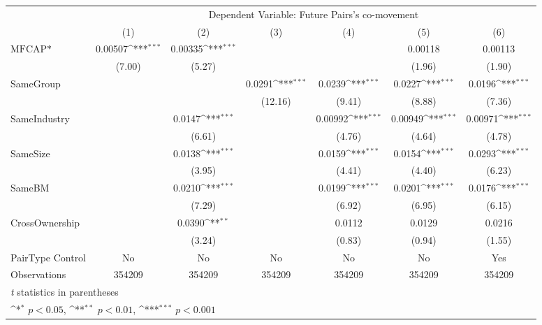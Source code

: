 {
\def\sym#1{\ifmmode^{#1}\else\(^{#1}\)\fi}
\begin{tabular}{l*{6}{c}}
\hline\hline
                &\multicolumn{6}{c}{Dependent Variable:  Future Pairs's co-movement}                                              \\\cmidrule(lr){2-7}
                &\multicolumn{1}{c}{(1)}         &\multicolumn{1}{c}{(2)}         &\multicolumn{1}{c}{(3)}         &\multicolumn{1}{c}{(4)}         &\multicolumn{1}{c}{(5)}         &\multicolumn{1}{c}{(6)}         \\
\hline
$ \text{MFCAP*} $&  0.00507\sym{***}&  0.00335\sym{***}&                  &                  &  0.00118         &  0.00113         \\
                &   (7.00)         &   (5.27)         &                  &                  &   (1.96)         &   (1.90)         \\
[1em]
SameGroup       &                  &                  &   0.0291\sym{***}&   0.0239\sym{***}&   0.0227\sym{***}&   0.0196\sym{***}\\
                &                  &                  &  (12.16)         &   (9.41)         &   (8.88)         &   (7.36)         \\
[1em]
SameIndustry    &                  &   0.0147\sym{***}&                  &  0.00992\sym{***}&  0.00949\sym{***}&  0.00971\sym{***}\\
                &                  &   (6.61)         &                  &   (4.76)         &   (4.64)         &   (4.78)         \\
[1em]
SameSize        &                  &   0.0138\sym{***}&                  &   0.0159\sym{***}&   0.0154\sym{***}&   0.0293\sym{***}\\
                &                  &   (3.95)         &                  &   (4.41)         &   (4.40)         &   (6.23)         \\
[1em]
SameBM          &                  &   0.0210\sym{***}&                  &   0.0199\sym{***}&   0.0201\sym{***}&   0.0176\sym{***}\\
                &                  &   (7.29)         &                  &   (6.92)         &   (6.95)         &   (6.15)         \\
[1em]
CrossOwnership  &                  &   0.0390\sym{**} &                  &   0.0112         &   0.0129         &   0.0216         \\
                &                  &   (3.24)         &                  &   (0.83)         &   (0.94)         &   (1.55)         \\
\hline
PairType Control&       No         &       No         &       No         &       No         &       No         &      Yes         \\
Observations    &   354209         &   354209         &   354209         &   354209         &   354209         &   354209         \\
\hline\hline
\multicolumn{7}{l}{\footnotesize \textit{t} statistics in parentheses}\\
\multicolumn{7}{l}{\footnotesize \sym{*} \(p<0.05\), \sym{**} \(p<0.01\), \sym{***} \(p<0.001\)}\\
\end{tabular}
}
